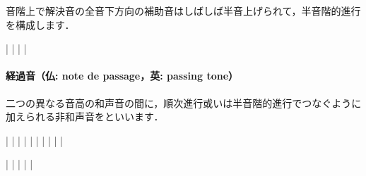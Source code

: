\documentclass[dvipdfmx,uplatex,b5paper,openany,jbase=12Q,nomag*,textwidth-limit=44%
               ]{gachimuchi}[2020/05/05]
\begin{document}
音階上で解決音の全音下方向の補助音はしばしば半音上げられて，半音階的進行を構成します．
\begin{Music}[.6\linewidth]
  \generalmeter{\meterC}%
  \Startpiece%
  \NOtes%
  |%
  \en\NOTes%
  |%
  \en\doublebar%
  \NOtes%
  |%
  \en\NOTes%
  |%
  \en\setdoublebar%
  \endpiece%
\end{Music}

\paragraph{経過音（仏: note de passage，英: passing tone）}
二つの異なる音高の和声音の間に，順次進行或いは半音階的進行でつなぐように加えられる非和声音をといいます．
\begin{Music}
  \generalmeter{\meterC}%
  \Startpiece%
  \NOtes%
  |\zchordsu{\Cross}%
  \en\NOTes%
  |%
  \en\doublebar%
  \NOtes%
  |\zchordsu{\Cross}%
  \en\NOTes%
  |%
  \en\doublebar%
  \NOtes%
  |\zchordsu{\Cross}%
  \en\NOTes%
  |%
  \en\doublebar%
  \NOtes%
  |\zchordsu{\Cross}%
  \en\NOTes%
  |%
  \en\doublebar%
  \NOtes%
  |\zchordsu{\Cross}\zchordsu{\Cross}%
  \en\doublebar%
  \NOtes%
  |\zchordsu{\Cross}\zchordsu{\Cross}%
  \en\setdoublebar%
  \endpiece%
\end{Music}
\begin{Music}[.6\linewidth]
  \generalmeter{\meterC}%
  \Startpiece%
  \NOtes%
  |%
  \en\NOTes%
  |%
  \en\doublebar%
  \NOtes%
  |%
  \en\Notes%
  |%
  \en\NOTes%
  |%
  \en\setdoublebar%
  \endpiece%
\end{Music}
\end{document}
